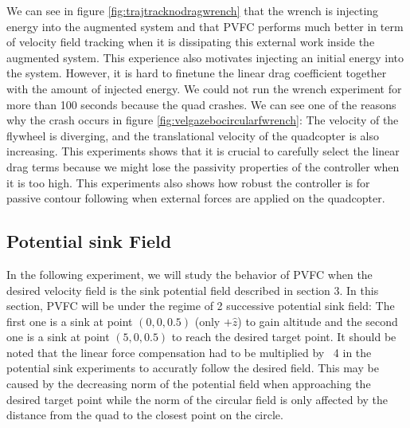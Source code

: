 We can see in figure \ref{fig:trajtracknodragwrench} that the wrench is injecting energy into the augmented system and that PVFC performs much better in term of velocity field tracking when it is dissipating this external work inside the augmented system. 
This experience also motivates injecting an initial energy into the system. However, it is hard to finetune the linear drag coefficient together with the amount of injected energy.
We could not run the wrench experiment for more than 100 seconds because the quad crashes. We can see one of the reasons why the crash occurs in figure \ref{fig:velgazebocircularfwrench}: The velocity of the flywheel is diverging, and the translational velocity of the quadcopter is also increasing. 
This experiments shows that it is crucial to carefully select the linear drag terms because we might lose the passivity properties of the controller when it is too high.
This experiments also shows how robust the controller is for passive contour following when external forces are applied on the quadcopter.
\subsection{Potential sink Field}
In the following experiment, we will study the behavior of PVFC when the desired velocity field is the sink potential field described in section 3.
In this section, PVFC will be under the regime of 2 successive potential sink field: The first one is a sink at point $(0,0,0.5)$ (only $+\hat{z}$) to gain altitude and
the second one is a sink at point $(5,0,0.5)$ to reach the desired target point. 
It should be noted that the linear force compensation had to be multiplied by ~4 in the potential sink experiments to accuratly follow the desired field.
This may be caused by the decreasing norm of the potential field when approaching the desired target point while the norm of the circular field is only affected by the distance from the quad to the closest point on the circle.  
